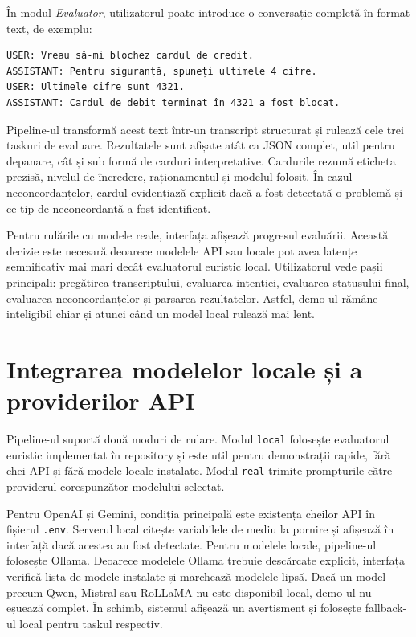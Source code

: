 În modul \textit{Evaluator}, utilizatorul poate introduce o conversație completă în format text, de exemplu:

\begin{verbatim}
USER: Vreau să-mi blochez cardul de credit.
ASSISTANT: Pentru siguranță, spuneți ultimele 4 cifre.
USER: Ultimele cifre sunt 4321.
ASSISTANT: Cardul de debit terminat în 4321 a fost blocat.
\end{verbatim}

Pipeline-ul transformă acest text într-un transcript structurat și rulează cele trei taskuri de evaluare. Rezultatele sunt afișate atât ca JSON complet, util pentru depanare, cât și sub formă de carduri interpretative. Cardurile rezumă eticheta prezisă, nivelul de încredere, raționamentul și modelul folosit. În cazul neconcordanțelor, cardul evidențiază explicit dacă a fost detectată o problemă și ce tip de neconcordanță a fost identificat.

Pentru rulările cu modele reale, interfața afișează progresul evaluării. Această decizie este necesară deoarece modelele API sau locale pot avea latențe semnificativ mai mari decât evaluatorul euristic local. Utilizatorul vede pașii principali: pregătirea transcriptului, evaluarea intenției, evaluarea statusului final, evaluarea neconcordanțelor și parsarea rezultatelor. Astfel, demo-ul rămâne inteligibil chiar și atunci când un model local rulează mai lent.

\section{Integrarea modelelor locale și a providerilor API}
\label{sec:demo-pipeline-provideri}

Pipeline-ul suportă două moduri de rulare. Modul \texttt{local} folosește evaluatorul euristic implementat în repository și este util pentru demonstrații rapide, fără chei API și fără modele locale instalate. Modul \texttt{real} trimite prompturile către providerul corespunzător modelului selectat.

Pentru OpenAI și Gemini, condiția principală este existența cheilor API în fișierul \texttt{.env}. Serverul local citește variabilele de mediu la pornire și afișează în interfață dacă acestea au fost detectate. Pentru modelele locale, pipeline-ul folosește Ollama. Deoarece modelele Ollama trebuie descărcate explicit, interfața verifică lista de modele instalate și marchează modelele lipsă. Dacă un model precum Qwen, Mistral sau RoLLaMA nu este disponibil local, demo-ul nu eșuează complet. În schimb, sistemul afișează un avertisment și folosește fallback-ul local pentru taskul respectiv.

